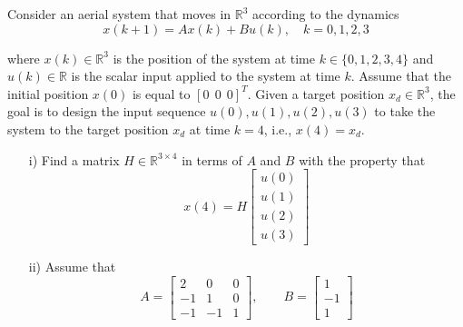 \begin{homeworkProblem}

    Consider an  aerial system that moves in $\mathbb R^3$ according to the 
    dynamics
    \begin{equation}
        x(k+1)=Ax(k)+Bu(k), \quad k=0,1,2,3
    \end{equation}

    where $x(k)\in\mathbb R^3$ is the position of the system at time $k \in 
    \{0, 1, 2, 3, 4\}$ and $u(k) \in \mathbb R$ is the scalar input applied to 
    the system at time $k$. Assume that the initial position $x(0)$ is equal 
    to $[0 \ \ 0 \ \ 0]^T$. Given a target position $x_d\in\mathbb R^3$, the 
    goal is to design the input sequence $u(0), u(1),u(2),u(3)$ to take the 
    system to the target position $x_d$ at time $k=4$, i.e., $x(4)=x_d$. 

    \begin{itemize}
        \item [i)] Find a matrix $H \in \mathbb R^{3 \times 4}$ in terms of 
        $A$ and $B$ with the property that
        \begin{equation}
            x(4) = H \left[ \begin{array}{c} 
                        u(0) \\ 
                        u(1) \\ 
                        u(2) \\ 
                        u(3) \end{array} 
                    \right]
        \end{equation}
        
        \item [ii)] Assume that 
            \begin{equation}
                \label{eq1}
                A = \left[ \begin{array}{ccc} 
                        2 & 0 & 0 \\ 
                        -1 & 1 & 0 \\ 
                        -1 & -1 & 1 \end{array}
                    \right], \qquad 
                B = \left[ \begin{array}{c} 
                        1 \\ 
                        -1 \\ 
                        1 \end{array}
                    \right]
            \end{equation}
            

\end{itemize}
\end{homeworkProblem}

